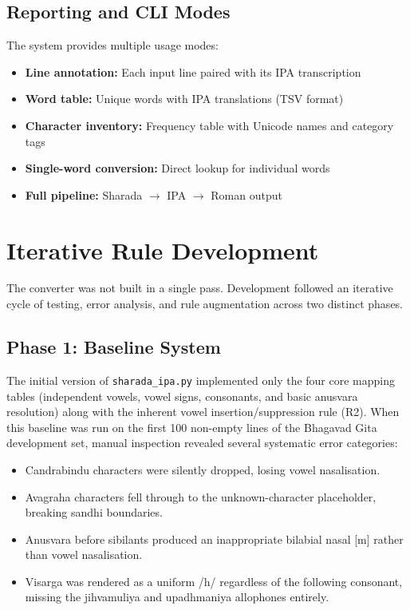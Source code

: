 \documentclass[11pt]{article}
\begin{document}
\subsection{Reporting and CLI Modes}
The system provides multiple usage modes:
\begin{itemize}
    \item \textbf{Line annotation:} Each input line paired with its IPA transcription
    \item \textbf{Word table:} Unique words with IPA translations (TSV format)
    \item \textbf{Character inventory:} Frequency table with Unicode names and category tags
    \item \textbf{Single-word conversion:} Direct lookup for individual words
    \item \textbf{Full pipeline:} Sharada $\rightarrow$ IPA $\rightarrow$ Roman output
\end{itemize}

\section{Iterative Rule Development}

The converter was not built in a single pass. Development followed an iterative cycle of testing, error analysis, and rule augmentation across two distinct phases.

\subsection{Phase 1: Baseline System}
The initial version of \texttt{sharada\_ipa.py} implemented only the four core mapping tables (independent vowels, vowel signs, consonants, and basic anusvara resolution) along with the inherent vowel insertion/suppression rule (R2). When this baseline was run on the first 100 non-empty lines of the Bhagavad Gita development set, manual inspection revealed several systematic error categories:

\begin{itemize}
    \item Candrabindu characters were silently dropped, losing vowel nasalisation.
    \item Avagraha characters fell through to the unknown-character placeholder, breaking sandhi boundaries.
    \item Anusvara before sibilants produced an inappropriate bilabial nasal [m] rather than vowel nasalisation.
    \item Visarga was rendered as a uniform /h/ regardless of the following consonant, missing the jihvamuliya and upadhmaniya allophones entirely.
\end{itemize}
\end{document}
